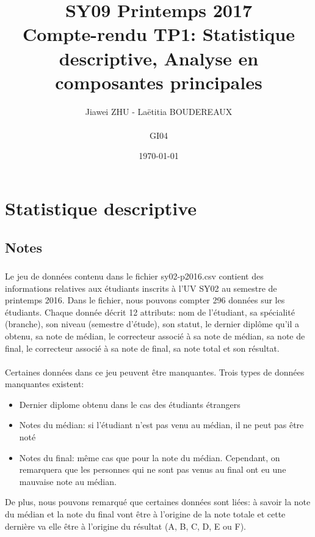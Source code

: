 \documentclass[titlepage]{article}
\begin{document}
\title{SY09 Printemps 2017\\Compte-rendu TP1: Statistique descriptive, Analyse en composantes principales}
\author{Jiawei ZHU - Laëtitia BOUDEREAUX\\\\GI04}
\date{\today}
\maketitle

\section{Statistique descriptive}
\subsection{Notes}
\subsubsection{}
Le jeu de données contenu dans le fichier sy02-p2016.csv contient des informations relatives aux
étudiants inscrits à l’UV SY02 au semestre de printemps 2016. Dans le fichier, nous pouvons compter 296 données sur les étudiants. Chaque donnée décrit 12 attributs: nom de l'étudiant, sa spécialité (branche), son niveau (semestre d'étude), son statut, le dernier diplôme qu'il a obtenu, sa note de médian, le correcteur associé à sa note de médian, sa note de final, le correcteur associé à sa note de final, sa note total et son résultat.
\paragraph{}
Certaines données dans ce jeu peuvent être manquantes. Trois types de données manquantes existent:
\begin{itemize}
\item Dernier diplome obtenu dans le cas des étudiants étrangers
\item Notes du médian: si l'étudiant n'est pas venu au médian, il ne peut pas être noté
\item Notes du final: même cas que pour la note du médian. Cependant, on remarquera que les personnes qui ne sont pas venus au final ont eu une mauvaise note au médian.
\end{itemize}
De plus, nous pouvons remarqué que certaines données sont liées: à savoir la note du médian et la note du final vont être à l'origine de la note totale et cette dernière va elle être à l'origine du résultat (A, B, C, D, E ou F).
\end{document}
